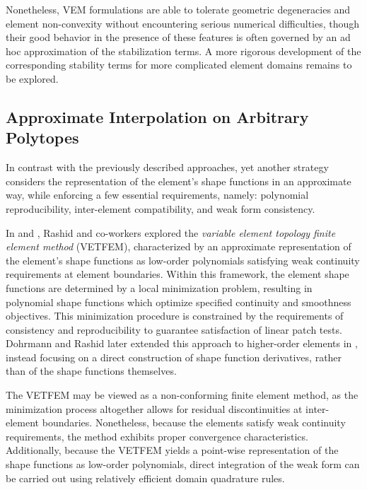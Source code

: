 		Nonetheless, VEM formulations are able to tolerate geometric degeneracies and element non-convexity without encountering serious numerical difficulties, though their good behavior in the presence of these features is often governed by an ad hoc approximation of the stabilization terms. A more rigorous development of the corresponding stability terms for more complicated element domains remains to be explored.
		
	\subsection*{Approximate Interpolation on Arbitrary Polytopes}
		In contrast with the previously described approaches, yet another strategy considers the representation of the element's shape functions in an approximate way, while enforcing a few essential requirements, namely: polynomial reproducibility, inter-element compatibility, and weak form consistency.
		
		In \cite{Rashid:00} and \cite{Rashid:06}, Rashid and co-workers  explored the \textit{variable element topology finite element method} (VETFEM), characterized by an approximate representation of the element's shape functions as low-order polynomials satisfying weak continuity requirements at element boundaries. Within this framework, the element shape functions are determined by a local minimization problem, resulting in polynomial shape functions which optimize specified continuity and smoothness objectives. This minimization procedure is constrained by the requirements of consistency and reproducibility to guarantee satisfaction of linear patch tests. Dohrmann and Rashid later extended this approach to higher-order elements in \cite{Dohrmann:02}, instead focusing on a direct construction of shape function derivatives, rather than of the shape functions themselves.
		
		The VETFEM may be viewed as a non-conforming finite element method, as the minimization process altogether allows for residual discontinuities at inter-element boundaries. Nonetheless, because the elements satisfy weak continuity requirements, the method exhibits proper convergence characteristics. Additionally, because the VETFEM yields a point-wise representation of the shape functions as low-order polynomials, direct integration of the weak form can be carried out using relatively efficient domain quadrature rules.
			

